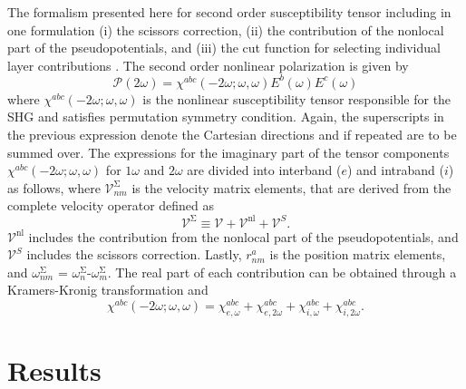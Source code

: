 \documentclass[pss]{wiley2sp} %
\begin{document}
The formalism presented here for second order susceptibility tensor including
in one formulation (i) the scissors correction, (ii) the contribution of the
nonlocal part of the pseudopotentials, and (iii) the cut function for
selecting individual layer contributions \cite{andersonPRB15}. The second
order nonlinear polarization is given by
\begin{equation*}\label{eq:pol}
\mathcal{P}(2\omega) = 
\chi^{abc}(-2\omega;\omega,\omega)E^{b}(\omega)E^{c}(\omega)
\end{equation*}
where $\chi^{abc}(-2\omega;\omega,\omega)$ is the nonlinear susceptibility
tensor responsible for the SHG and satisfies permutation symmetry condition.
Again, the superscripts in the previous expression denote the Cartesian
directions and if repeated are to be summed over. The expressions for the
imaginary part of the tensor components $\chi^{abc}(-2\omega;\omega,\omega)$
for $1\omega$ and $2\omega$ are divided into interband ($e$) and intraband
($i$) as follows, where $\mathcal{V}^{\mathrm{\Sigma}}_{nm}$ is the velocity
matrix elements, that are derived from the complete velocity operator defined
as
\begin{equation*}\label{eq:nonlocal}
\boldsymbol{\mathcal{V}}^{\mathrm{\Sigma}}\equiv
\boldsymbol{\mathcal{V}}+
\boldsymbol{\mathcal{V}}^{\mathrm{nl}}+
\boldsymbol{\mathcal{V}}^{S}.
\end{equation*}
$\boldsymbol{\mathcal{V}}^{\mathrm{nl}}$ includes the contribution from the
nonlocal part of the pseudopotentials, and $\boldsymbol{\mathcal{V}}^{S}$
includes the scissors correction. Lastly, $r^{a}_{nm}$ is the position matrix
elements, and $\omega^\mathrm{\Sigma}_{nm}$ =
$\omega^{\mathrm{\Sigma}}_{n}$-$\omega^{\mathrm{\Sigma}}_{m}$. The real part
of each contribution can be obtained through a Kramers-Kronig transformation
\cite{tancognePRB14} and
\begin{equation}\label{eq:chitotal}
\chi^{abc} (-2\omega;\omega,\omega) =
\chi^{abc}_{e,\omega} + \chi^{abc}_{e,2\omega} +
\chi^{abc}_{i,\omega} + \chi^{abc}_{i,2\omega}.
\end{equation}

\section{Results}\label{sec:results}
\end{document}
